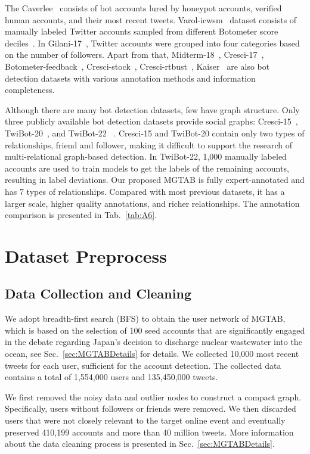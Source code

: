 \documentclass[10pt,twocolumn,letterpaper]{article}
\begin{document}
The Caverlee~\cite{Alpher47} consists of bot accounts lured by honeypot accounts, verified human accounts, and their most recent tweets. Varol-icwsm~\cite{Alpher03} dataset consists of manually labeled Twitter accounts sampled from different Botometer score deciles~\cite{Alpher48}. In Gilani-17~\cite{Alpher49}, Twitter accounts were grouped into four categories based on the number of followers. Apart from that, Midterm-18~\cite{Alpher50}, Cresci-17~\cite{Alpher04}, Botometer-feedback~\cite{Alpher35}, Cresci-stock~\cite{Alpher51}, Cresci-rtbust~\cite{Alpher52}, Kaiser~\cite{Alpher53} are also bot detection datasets with various annotation methods and information completeness.

Although there are many bot detection datasets, few have graph structure. Only three publicly available bot detection datasets provide social graphs: Cresci-15~\cite{Alpher10}, TwiBot-20~\cite{Alpher11}, and TwiBot-22 ~\cite{Alpher12}. Cresci-15 and TwiBot-20 contain only two types of relationships, friend and follower, making it difficult to support the research of multi-relational graph-based detection. In TwiBot-22, 1,000 manually labeled accounts are used to train models to get the labels of the remaining accounts, resulting in label deviations. Our proposed MGTAB is fully expert-annotated and has 7 types of relationships. Compared with most previous datasets, it has a larger scale, higher quality annotations, and richer relationships. The annotation comparison is presented in Tab.~\ref{tab:A6}.


\section{Dataset Preprocess}
\label{sec:datapre}
\subsection{Data Collection and Cleaning}
\label{sec:datapre-1}
We adopt breadth-first search (BFS) to obtain the user network of MGTAB, which is based on the selection of 100 seed accounts that are significantly engaged in the debate regarding Japan's decision to discharge nuclear wastewater into the ocean, see Sec.~\ref{sec:MGTABDetails} for details. We collected 10,000 most recent tweets for each user, sufficient for the account detection. The collected data contains a total of 1,554,000 users and 135,450,000 tweets.

We first removed the noisy data and outlier nodes to construct a compact graph. Specifically, users without followers or friends were removed. We then discarded users that were not closely relevant to the target online event and eventually preserved 410,199 accounts and more than 40 million tweets. More information about the data cleaning process is presented in Sec.~\ref{sec:MGTABDetails}.
\end{document}
